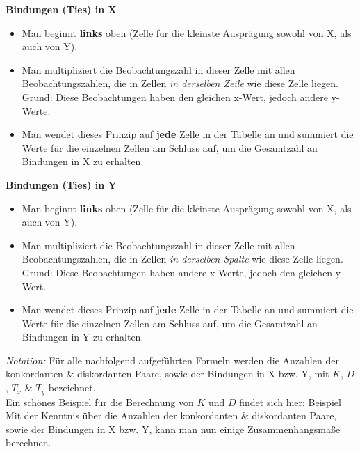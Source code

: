 \documentclass[a4paper]{article}
\newcommand\dangersign{%
 \makebox[1.8em][c]{%
 \makebox[0pt][c]{\raisebox{.15em}{\small!}}%
 \makebox[0pt][c]{\color{red}\Large$\triangle$}}}%
\begin{document}
\noindent \textbf{Bindungen (Ties) in X}
\begin{itemize}
    \item Man beginnt \textbf{links} oben (Zelle für die kleinste Ausprägung sowohl von X, als auch von Y).
    \item Man multipliziert die Beobachtungszahl in dieser Zelle mit allen Beobachtungszahlen, die in Zellen \textit{in derselben Zeile} wie diese Zelle liegen.\\
    Grund: Diese Beobachtungen haben den gleichen x-Wert, jedoch andere y-Werte.
    \item Man wendet dieses Prinzip auf \textbf{jede} Zelle in der Tabelle an und summiert die Werte für die einzelnen Zellen am Schluss auf, um die Gesamtzahl an Bindungen in X zu erhalten.
\end{itemize}

\noindent \textbf{Bindungen (Ties) in Y}
\begin{itemize}
    \item Man beginnt \textbf{links} oben (Zelle für die kleinste Ausprägung sowohl von X, als auch von Y).
    \item Man multipliziert die Beobachtungszahl in dieser Zelle mit allen Beobachtungszahlen, die in Zellen \textit{in derselben Spalte} wie diese Zelle liegen.\\
    Grund: Diese Beobachtungen haben andere x-Werte, jedoch den gleichen y-Wert.
    \item Man wendet dieses Prinzip auf \textbf{jede} Zelle in der Tabelle an und summiert die Werte für die einzelnen Zellen am Schluss auf, um die Gesamtzahl an Bindungen in Y zu erhalten.
\end{itemize}

\noindent \dangersign \textit{Notation:} Für alle nachfolgend aufgeführten Formeln werden die Anzahlen der konkordanten \& diskordanten Paare, sowie der Bindungen in X bzw. Y, mit $K$, $D$, $T_x$ \& $T_y$ bezeichnet.\\

\noindent Ein schönes Beispiel für die Berechnung von $K$ und $D$ findet sich hier: \hfill \href{https://support.minitab.com/de-de/minitab/19/help-and-how-to/statistics/tables/supporting-topics/other-statistics-and-tests/what-are-concordant-and-discordant-pairs/}{Beispiel}\\

\noindent Mit der Kenntnis über die Anzahlen der konkordanten \& diskordanten Paare, sowie der Bindungen in X bzw. Y, kann man nun einige Zusammenhangsmaße berechnen.
\end{document}

